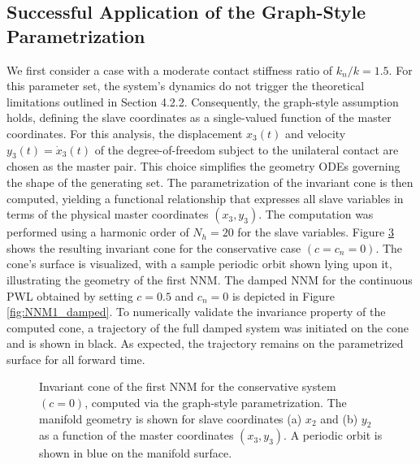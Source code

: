 \documentclass[a4paper,9pt,parskip=half,english]{article}
\theoremstyle{plain}
\theoremstyle{definition}
\begin{document}
\subsection{Successful Application of the Graph-Style Parametrization}
We first consider a case with a moderate contact stiffness ratio of $k_n/k = 1.5$. For this parameter set, the system's dynamics do not trigger the theoretical limitations outlined in Section 4.2.2. Consequently, the graph-style assumption holds, defining the slave coordinates as a single-valued function of the master coordinates. For this analysis, the displacement $x_3(t)$ and velocity $y_3(t) = \dot{x}_3(t)$ of the degree-of-freedom subject to the unilateral contact are chosen as the master pair. This choice simplifies the geometry ODEs governing the shape of the generating set. The parametrization of the invariant cone is then computed, yielding a functional relationship that expresses all slave variables in terms of the physical master coordinates $(x_3,y_3)$. The computation was performed using a harmonic order of $N_h=20$ for the slave variables. Figure \ref{fig:consNNM1} shows the resulting invariant cone for the conservative case $(c=c_n=0)$. The cone's surface is visualized, with a sample periodic orbit shown lying upon it, illustrating the geometry of the first NNM. The damped NNM for the continuous PWL obtained by setting $c=0.5$ and $c_n=0$ is depicted in Figure \ref{fig:NNM1_damped}. To numerically validate the invariance property of the computed cone, a trajectory of the full damped system was initiated on the cone and is shown in black. As expected, the trajectory remains on the parametrized surface for all forward time.
\begin{figure}
	\begin{subfigure}{0.49\linewidth}
		\centering
		\caption{}
		\label{fig:consNNM1_sldisp}
	\end{subfigure}
	\begin{subfigure}{0.49\linewidth}
		\centering
		
		\caption{}
		\label{fig:consNNM1_slvelo}
	\end{subfigure}
	\caption{Invariant cone of the first NNM for the conservative system $(c=0)$, computed via the graph-style parametrization. The manifold geometry is shown for slave coordinates (a) $x_2$ and (b) $y_2$ as a function of the master coordinates $(x_3,y_3)$. A periodic orbit is shown in blue on the manifold surface.}
	\label{fig:consNNM1}
\end{figure}
\end{document}
